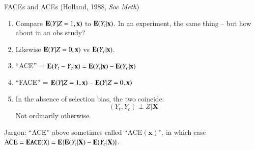   

\begin{frame}{FACEs and ACEs (Holland, 1988, \textit{Soc Meth}) }
  \begin{enumerate}[<+->]
  \item   Compare $\mathbf{E}(Y | Z=1, \mathbf{x})$ to $\mathbf{E}(Y_{t}| \mathbf{x})$.  In
  an experiment, the same thing -- but how about in an obs study?
\item Likewise  $\mathbf{E}(Y | Z=0, \mathbf{x})$ vs $\mathbf{E}(Y_{c}| \mathbf{x})$.
\item ``ACE'' = $\mathbf{E}(Y_t - Y_c| \mathbf{x}) = \mathbf{E}(Y_{t}| \mathbf{x}) - \mathbf{E}(Y_{c}| \mathbf{x})$
\item ``FACE'' = $\mathbf{E}(Y | Z=1, \mathbf{x}) - \mathbf{E}(Y | Z=0, \mathbf{x})$
\item In the absence of selection bias, the two coincide:
$$ (Y_{t}, Y_{c}) \perp Z | \mathbf{X}$$
Not ordinarily otherwise.
  \end{enumerate}

Jargon:
``ACE'' above sometimes called ``$\mathrm{ACE}(\mathbf{x})$'',
  in which case $\mathrm{ACE} = \mathbf{E}\mathtt{ACE}(\mathtt{X}) = \mathbf{E}\{ \mathbf{E}(Y_{t}|\mathbf{X}) -
  \mathbf{E}(Y_{c}|\mathbf{X}) \}$.


\end{frame}

